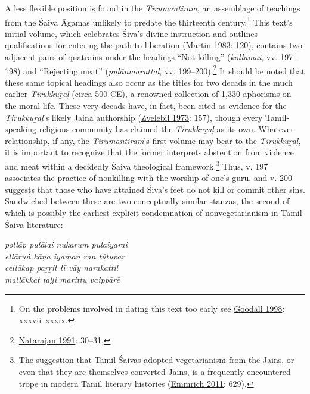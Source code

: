 A less flexible position is found in the \emph{{Tirumantiram}}, an assemblage of teachings from the Śaiva Āgamas unlikely to predate the thirteenth century.\footnote{%
On the problems involved in dating this text too early see \hyperref[Goodall1998]{Goodall 1998}:  xxxvii–xxxix.
}
 This text’s initial volume, which celebrates Śiva’s divine instruction and outlines qualifications for entering the path to liberation (\hyperref[Martin1983]{Martin 1983}: 120), contains two adjacent pairs of quatrains under the headings “Not killing” (\emph{kollāmai}, vv. 197–198) and “Rejecting meat” (\emph{pulāṉmaṟuttal}, vv. 199–200).\footnote{%
\hyperref[Natarajan1991]{Natarajan 1991}: 30–31. 
}
 It should be noted that these same topical headings also occur as the titles for two decads in the much earlier \emph{{Tirukkuṟaḷ}} (circa 500 CE), a renowned collection of 1,330 aphorisms on the moral life. These very decads have, in fact, been cited as evidence for the \emph{{Tirukkuṟaḷ}}’s likely Jaina authorship (\hyperref[Zvelebil1973]{Zvelebil 1973}: 157), though every Tamil-speaking religious community has claimed the \emph{{Tirukkuṟaḷ}} as its own. Whatever relationship, if any, the \emph{{Tirumantiram}}’s first volume may bear to the \emph{{Tirukkuṟaḷ}}, it is important to recognize that the former interprets abstention from violence and meat within a decidedly Śaiva theological framework.\footnote{%
The suggestion that Tamil Śaivas adopted vegetarianism from the Jains, or even that they are themselves converted Jains, is a frequently encountered trope in modern Tamil literary histories (\hyperref[Emmrich2011]{Emmrich 2011}: 629).
}
 Thus, v. 197 associates the practice of nonkilling with the worship of one’s guru, and v. 200 suggests that those who have attained Śiva’s feet do not kill or commit other sins. Sandwiched between these are two conceptually similar stanzas, the second of which is possibly the earliest explicit condemnation of nonvegetarianism in Tamil Śaiva literature:

\begin{pullquote}\raggedright
      \emph{pollāp pulālai nukarum pulaiyarai}\\
\emph{ellāruṅ kāṇa iyamaṉ ṟaṉ tūtuvar}\\
\emph{cellākap paṟṟit tī vāy narakattil}\\
\emph{mallākkat taḷḷi maṟittu vaippārē}
\end{pullquote}
      
